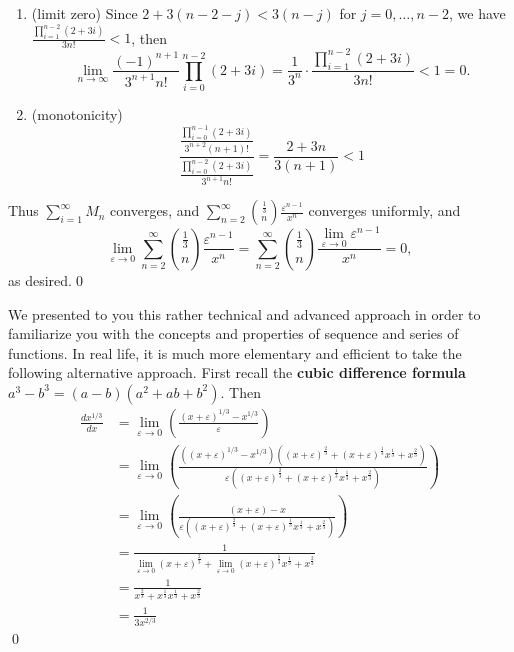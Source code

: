 \documentclass[10pt]{article}
\begin{document}
\begin{enumerate}[label=\alph*.]
\begin{enumerate}[label=\arabic*.]
\item (limit zero) Since $2+3(n-2-j)<3(n-j)$ for $j=0,\dots,n-2$, we have $\displaystyle\frac{\prod_{i=1}^{n-2}(2+3i)}{3n!}<1$, then $$\lim_{n\to\infty}\frac{(-1)^{n+1}}{3^{n+1}n!}\prod_{i=0}^{n-2}(2+3i)=\frac{1}{3^n}\cdot\frac{\prod_{i=1}^{n-2}(2+3i)}{3n!}<1=0.$$
\item (monotonicity) $$\frac{\displaystyle\frac{\prod_{i=0}^{n-1}(2+3i)}{3^{n+2}(n+1)!}}{\displaystyle\frac{\prod_{i=0}^{n-2}(2+3i)}{3^{n+1}n!}}=\frac{2+3n}{3(n+1)}<1$$
\end{enumerate}
Thus $\sum_{i=1}^\infty M_n$ converges, and $\sum_{n=2}^{\infty}\binom{\frac{1}{3}}{n} \frac{\varepsilon^{n-1}}{x^n}$ converges uniformly, and $$\lim_{\varepsilon\to0}\sum_{n=2}^{\infty}\binom{\frac{1}{3}}{n} \frac{\varepsilon^{n-1}}{x^n}=\sum_{n=2}^{\infty}\binom{\frac{1}{3}}{n} \frac{\lim_{\varepsilon\to0}\varepsilon^{n-1}}{x^n}=0,$$ as desired.\qed

\newpage
We presented to you this rather technical and advanced approach in order to familiarize you with the concepts and properties of sequence and series of functions. In real life, it is much more elementary and efficient to take the following alternative approach. First recall the \textbf{cubic difference formula} $a^3-b^3=(a-b)(a^2+ab+b^2)$. Then $$\begin{aligned} \frac{d x^{1 / 3}}{d x} &=\lim _{\varepsilon \rightarrow 0}\left(\frac{(x+\varepsilon)^{1 / 3}-x^{1 / 3}}{\varepsilon}\right) \\ &=\lim _{\varepsilon \rightarrow 0}\left(\frac{((x+\varepsilon)^{1 / 3}-x^{1 / 3})((x+\varepsilon)^\frac{2}{3}+(x+\varepsilon)^\frac{1}{3}x^\frac{1}{3}+x^\frac{2}{3})}{\varepsilon((x+\varepsilon)^\frac{2}{3}+(x+\varepsilon)^\frac{1}{3}x^\frac{1}{3}+x^\frac{2}{3})}\right) \\ &=\lim _{\varepsilon \rightarrow 0}\left(\frac{(x+\varepsilon)-x}{\varepsilon((x+\varepsilon)^\frac{2}{3}+(x+\varepsilon)^\frac{1}{3}x^\frac{1}{3}+x^\frac{2}{3})}\right) \\ &=\frac{1}{\displaystyle\lim _{\varepsilon \rightarrow 0}(x+\varepsilon)^\frac{2}{3}+\lim _{\varepsilon \rightarrow 0}(x+\varepsilon)^\frac{1}{3}x^\frac{1}{3}+x^\frac{2}{3}} \\ &=\frac{1}{\displaystyle x^\frac{2}{3}+x^\frac{1}{3}x^\frac{1}{3}+x^\frac{2}{3}} \\ &=\frac{1}{3 x^{2 / 3}}\end{aligned}$$\qed


\end{enumerate}
\end{document}
